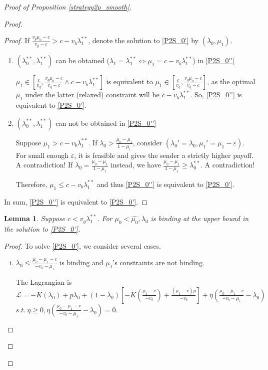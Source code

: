 \documentclass[11pt]{extarticle}
\newtheorem{lemma}{Lemma}
\newcommand{\lra}{\Leftrightarrow}
\newcommand{\m}{\wedge}
\begin{document}
\begin{proof}[Proof of Proposition \ref{strategy2p_smooth}]
\begin{enumerate}
\begin{proof}
\begin{proof}
				If $\frac{v_g\mu_0-c}{v_g-c} > c-v_b\lambda_1^{**}$, denote the solution to \eqref{P2S_0'} by $(\lambda_0, \mu_1)$.
				\begin{enumerate}
					\item $(\lambda_0^{**},\lambda_1^{**})$ can be obtained ($\lambda_1 = \lambda_1^{**} \lra \mu_1 = c-v_b\lambda_1^{**}$) in \eqref{P2S_0''}
					
					$\mu_1\in \left[\frac{c}{v_g}, \frac{v_g\mu_0-c}{v_g-c}\m c-v_b\lambda_1^{**} \right] $ is equivalent to $\mu_1\in \left[\frac{c}{v_g}, \frac{v_g\mu_0-c}{v_g-c} \right] $, as the optimal $\mu_1$ under the latter (relaxed) constraint will be $c-v_b\lambda_1^{**}$. So, \eqref{P2S_0''} is equivalent to \eqref{P2S_0'}. 
					
					\item $(\lambda_0^{**},\lambda_1^{**})$ can not be obtained in \eqref{P2S_0''}
					
					Suppose $\mu_1 > c-v_b\lambda_1^{**}$. If $\lambda_0 >\frac{\mu_0-\mu_1}{1-\mu_1}$, consider $(\lambda_0'=\lambda_0, \mu_1'=\mu_1 - \varepsilon)$. For small enough $\varepsilon$, it is feasible and gives the sender a strictly higher payoff. A contradiction! If $\lambda_0 =\frac{\mu_0-\mu_1}{1-\mu_1}$ instead, we have $\frac{\mu_0-\mu_1}{1-\mu_1} \geq \lambda_0^{**}$. A contradiction!
					
					Therefore, $\mu_1 \leq c-v_b\lambda_1^{**}$ and thus \eqref{P2S_0''} is equivalent to \eqref{P2S_0'}. 
				\end{enumerate}
				
				In sum, \eqref{P2S_0''} is equivalent to \eqref{P2S_0'}.	
			\end{proof}
			
			\begin{lemma}\label{binding}
				Suppose $c < v_g\lambda_1^{**}$. For $\mu_0 < \widehat{\mu_0}, \lambda_0$ is binding at the upper bound in the solution to \eqref{P2S_0'}.
			\end{lemma}
			\begin{proof}
				To solve \eqref{P2S_0'}, we consider several cases.
				
				\begin{enumerate}[i)]
					\item $\lambda_0 \leq \frac{\mu_0-\mu_1-c}{-v_b-\mu_1}$ is binding and $\mu_1$'s constraints are not binding.
					
					The Lagrangian is $\mathcal{L} = -K(\lambda_0) + p \lambda_0 + (1-\lambda_0) \left[-K(\frac{\mu_1-c}{-v_b})+\frac{(\mu_1-c)p}{-v_b}\right] + \eta \left(\frac{\mu_0-\mu_1-c}{-v_b-\mu_1}-\lambda_0\right)$ $s.t.~\eta \geq 0, \eta \left(\frac{\mu_0-\mu_1-c}{-v_b-\mu_1}-\lambda_0\right) = 0$.
					

\end{enumerate}
\end{proof}
\end{proof}
\end{enumerate}
\end{proof}
\end{document}
